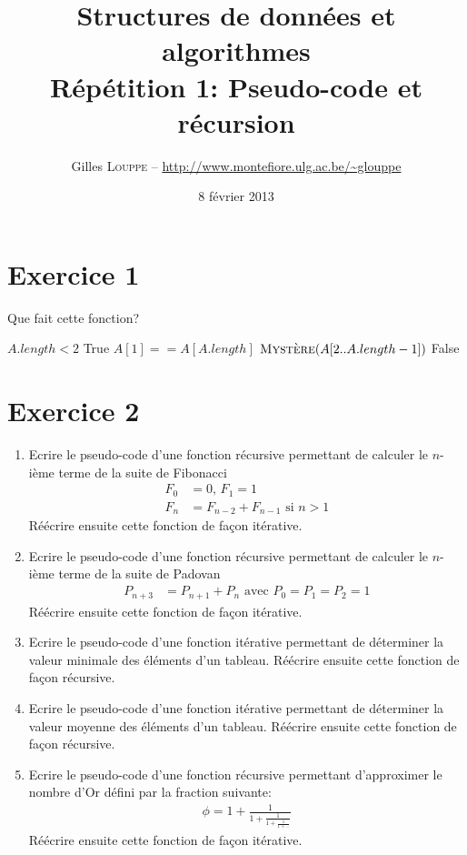 \documentclass[a4paper,10pt]{article}
\title{
    \textbf{Structures de données et algorithmes}\\
    Répétition 1: Pseudo-code et récursion
}
\author{Gilles \textsc{Louppe} -- \url{http://www.montefiore.ulg.ac.be/~glouppe}}
\date{8 février 2013}
\begin{document}
\maketitle

\section*{Exercice 1}

Que fait cette fonction?

\begin{codebox}
    \li \If $A.length < 2$
    \li \Then   \Return True
    \li \Else
    \li       \If $A[1] == A[A.length]$
    \li       \Then \Return $\textnormal{\scshape Mystère}(A[2..A.length-1])$
    \li       \Else
    \li             \Return False
              \End
        \End
    \End
\end{codebox}
\vspace{0.5cm}

\section*{Exercice 2}

\begin{enumerate}
\item Ecrire le pseudo-code d'une fonction récursive permettant de calculer le $n$-ième terme de la suite de Fibonacci
\begin{align*}
F_0 &= 0\text{, } F_1 = 1 \\
F_n &= F_{n-2} + F_{n-1} \text{ si } n > 1
\end{align*}
Réécrire ensuite cette fonction de façon itérative.

\item Ecrire le pseudo-code d'une fonction récursive permettant de calculer le $n$-ième terme de la suite de Padovan
\begin{align*}
P_{n+3} &= P_{n+1} + P_n \text{ avec } P_0 = P_1 = P_2 = 1
\end{align*}
Réécrire ensuite cette fonction de façon itérative.

\item Ecrire le pseudo-code d'une fonction itérative permettant de déterminer la valeur minimale des éléments d'un tableau. Réécrire ensuite cette fonction de façon récursive.

\item Ecrire le pseudo-code d'une fonction itérative permettant de déterminer la valeur moyenne des éléments d'un tableau. Réécrire ensuite cette fonction de façon récursive.

\item Ecrire le pseudo-code d'une fonction récursive permettant d'approximer le nombre d'Or défini par la fraction suivante:
\begin{align*}
\phi = 1 + \frac{1}{1 + \frac{1}{1 + \frac{1}{1 + ...}}}
\end{align*}
Réécrire ensuite cette fonction de façon itérative.

\end{enumerate}
\end{document}
